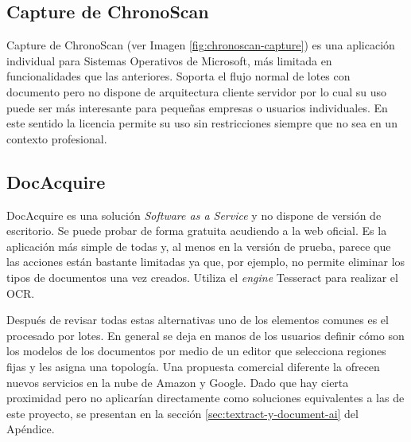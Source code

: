 \subsection{Capture de ChronoScan}

Capture de ChronoScan \cite{solucionesComerciales_chronoScanCapture_chronoScanDocumentCapture} (ver Imagen \ref{fig:chronoscan-capture}) es una aplicación individual para Sistemas Operativos de Microsoft, más limitada en funcionalidades que las anteriores. Soporta el flujo normal de lotes con documento pero no dispone de arquitectura cliente servidor por lo cual su uso puede ser más interesante para pequeñas empresas o usuarios individuales. En este sentido la licencia permite su uso sin restricciones siempre que no sea en un contexto profesional.

\subsection{DocAcquire}

DocAcquire \cite{solucionesComerciales_docAcquire_docAcquire} es una solución \emph{Software as a Service} y no dispone de versión de escritorio. Se puede probar de forma gratuita acudiendo a la web oficial. Es la aplicación más simple de todas y, al menos en la versión de prueba, parece que las acciones están bastante limitadas ya que, por ejemplo, no permite eliminar los tipos de documentos una vez creados. Utiliza el \emph{engine} Tesseract para realizar el OCR.

\newpage

Después de revisar todas estas alternativas uno de los elementos comunes es el procesado por lotes. En general se deja en manos de los usuarios definir cómo son los modelos de los documentos por medio de un editor que selecciona regiones fijas y les asigna una topología. Una propuesta comercial diferente la ofrecen nuevos servicios en la nube de Amazon y Google. Dado que hay cierta proximidad pero no aplicarían directamente como soluciones equivalentes a las de este proyecto, se presentan en la sección \ref{sec:textract-y-document-ai} del Apéndice.

